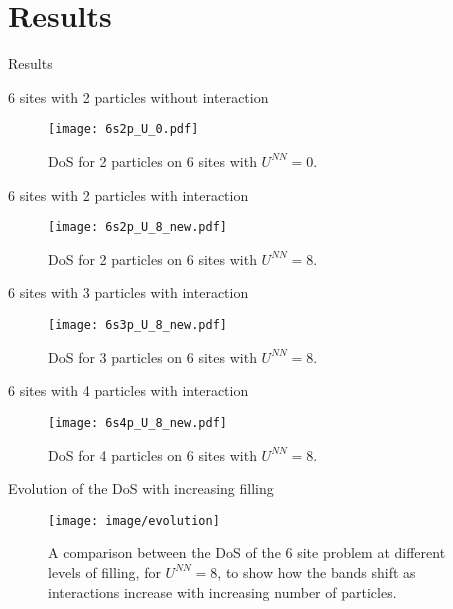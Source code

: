 \documentclass[usenames,dvipsnames]{beamer}
\begin{document}
\section{Results}
\begin{frame}
	\centering
	{\Huge Results}
\end{frame}

\begin{frame}{6 sites with 2 particles without interaction}
	\begin{figure}
		\centering
		\texttt{[image: 6s2p\_U\_0.pdf]}
		\caption{DoS for 2 particles on 6 sites with $ U^{NN} = 0 $.}
	\end{figure}
\end{frame}

\begin{frame}{6 sites with 2 particles with interaction}
	\begin{figure}
		\centering
		\texttt{[image: 6s2p\_U\_8\_new.pdf]}
		\caption{DoS for 2 particles on 6 sites with $ U^{NN} = 8 $.}
	\end{figure}
\end{frame}

\begin{frame}{6 sites with 3 particles with interaction}
	\begin{figure}
		\centering
		\texttt{[image: 6s3p\_U\_8\_new.pdf]}
		\caption{DoS for 3 particles on 6 sites with $ U^{NN} = 8 $.}
	\end{figure}
\end{frame}

\begin{frame}{6 sites with 4 particles with interaction}
	\begin{figure}
		\centering
		\texttt{[image: 6s4p\_U\_8\_new.pdf]}
		\caption{DoS for 4 particles on 6 sites with $ U^{NN} = 8 $.}
	\end{figure}
\end{frame}

\begin{frame}{Evolution of the DoS with increasing filling}
	\begin{figure}
		\centering
		\texttt{[image: image/evolution]}
		\caption{A comparison between the DoS of the 6 site problem at different levels of filling, for $ U^{NN} = 8 $, to show how the bands shift as interactions increase with increasing number of particles.}
		\label{fig:evolution}
	\end{figure}
\end{frame}
\end{document}
